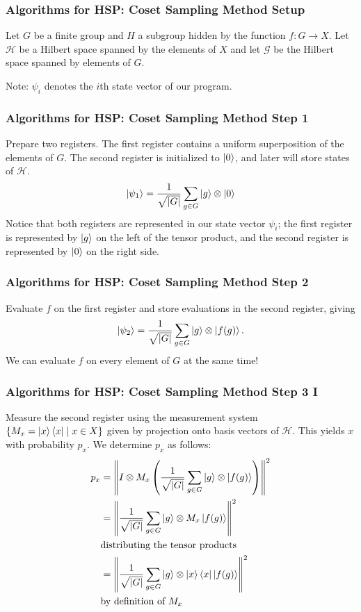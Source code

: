 \documentclass{beamer}
\renewcommand{\bra}{\Bra}
\renewcommand{\ket}{\Ket}
\newcommand{\abs}[1]{\left\lvert #1 \right\rvert}
\newcommand{\norm}[1]{\left\lVert #1 \right\rVert}
\renewcommand{\cal}[1]{\mathcal{#1}}
\begin{document}
\begin{frame}
\frametitle{Algorithms for HSP: Coset Sampling Method Setup}\label{sec:HSP_algorithms}
        Let $G$ be a finite group and $H$ a subgroup hidden by the function $f : G \to X$. Let $\cal{H}$ be a Hilbert space spanned by the elements of $X$ and let $\cal{G}$ be the Hilbert space spanned by elements of $G$.

        Note: $\psi_i$ denotes the $i$th state vector of our program. 
\end{frame}

\begin{frame}
\frametitle{Algorithms for HSP: Coset Sampling Method Step 1}
            Prepare two registers. 
            The first register contains a uniform superposition of the elements of $G$. 
            The second register is initialized to $\ket{0}$, and later will store states of $\cal{H}$.
                $$\ket{\psi_1} = \frac{1}{\sqrt{\abs{G}}} \sum_{g \in G} \ket{g} \otimes \ket{0}$$
            Notice that both registers are represented in our state vector $\psi_i$; the first register is represented by $\ket{g}$ on the left of the tensor product, and the second register is represented by $\ket{0}$ on the right side.
\end{frame}

\begin{frame}
\frametitle{Algorithms for HSP: Coset Sampling Method Step 2}
            Evaluate $f$ on the first register and store evaluations in the second register, giving
                $$\ket{\psi_2} = \frac{1}{\sqrt{\abs{G}}} \sum_{g \in G} \ket{g} \otimes \ket{f(g)}.$$
        We can evaluate $f$ on every element of $G$ at the same time!
\end{frame}

\begin{frame}
\frametitle{Algorithms for HSP: Coset Sampling Method Step 3 I}
            Measure the second register using the measurement system $\{M_x = \ket{x}\bra{x} \mid x \in X\}$ given by projection onto basis vectors of $\cal{H}$.
            This yields $x$ with probability $p_x$.
            We determine $p_x$ as follows:
            \begin{align*}
            p_x &= \norm{I \otimes M_x \left(\frac{1}{\sqrt{\abs{G}}} \sum_{g \in G} \ket{g} \otimes \ket{f(g)}\right)}^2\\
            &= \norm{\frac{1}{\sqrt{\abs{G}}} \sum_{g \in G} \ket{g} \otimes M_x \ket{f(g)}}^2\\
            & \text{distributing the tensor products}\\
            &= \norm{\frac{1}{\sqrt{\abs{G}}} \sum_{g \in G} \ket{g} \otimes \ket{x} \bra{x} \ket{f(g)}}^2\\
            & \text{by definition of $M_x$}
            \end{align*}
\end{frame}
\end{document}

